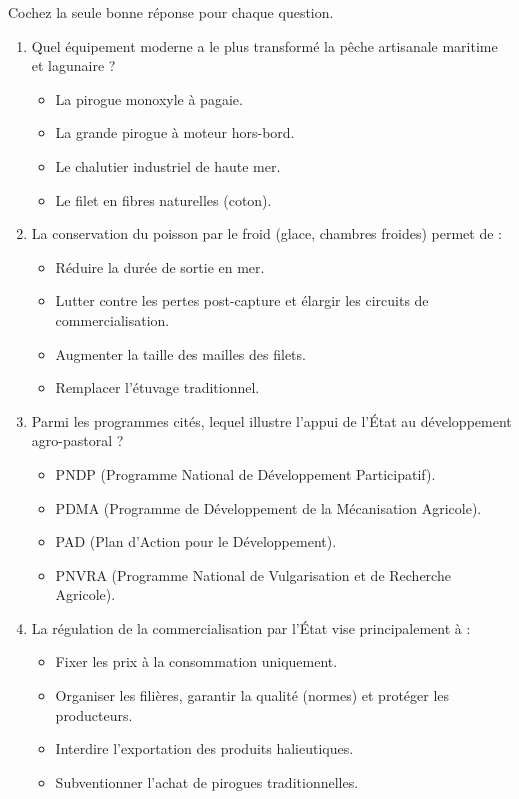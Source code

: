 \documentclass[11pt]{article}
\begin{document}
\begin{exercice}
Cochez la seule bonne réponse pour chaque question.
\begin{enumerate}
    \item Quel équipement moderne a le plus transformé la pêche artisanale maritime et lagunaire ?
    \begin{itemize}
        \item[A] La pirogue monoxyle à pagaie.
        \item[B] La grande pirogue à moteur hors-bord.
        \item[C] Le chalutier industriel de haute mer.
        \item[D] Le filet en fibres naturelles (coton).
    \end{itemize}
    \item La conservation du poisson par le froid (glace, chambres froides) permet de :
    \begin{itemize}
        \item[A] Réduire la durée de sortie en mer.
        \item[B] Lutter contre les pertes post-capture et élargir les circuits de commercialisation.
        \item[C] Augmenter la taille des mailles des filets.
        \item[D] Remplacer l'étuvage traditionnel.
    \end{itemize}
    \item Parmi les programmes cités, lequel illustre l'appui de l'État au développement agro-pastoral ?
    \begin{itemize}
        \item[A] PNDP (Programme National de Développement Participatif).
        \item[B] PDMA (Programme de Développement de la Mécanisation Agricole).
        \item[C] PAD (Plan d'Action pour le Développement).
        \item[D] PNVRA (Programme National de Vulgarisation et de Recherche Agricole).
    \end{itemize}
    \item La régulation de la commercialisation par l'État vise principalement à :
    \begin{itemize}
        \item[A] Fixer les prix à la consommation uniquement.
        \item[B] Organiser les filières, garantir la qualité (normes) et protéger les producteurs.
        \item[C] Interdire l'exportation des produits halieutiques.
        \item[D] Subventionner l'achat de pirogues traditionnelles.
    \end{itemize}
\end{enumerate}
\end{exercice}
\end{document}
